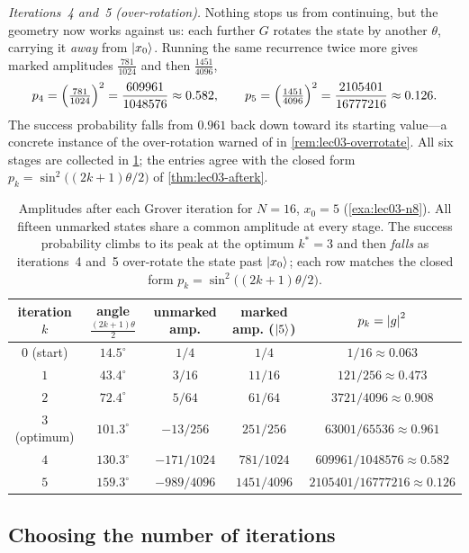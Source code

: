 \begin{example}[A fully worked run: $N=16$, marked item $x_0=5$]
\emph{Iterations~4 and~5 (over-rotation).} Nothing stops us from continuing, but the
geometry now works against us: each further $G$ rotates the state by another
$\theta$, carrying it \emph{away} from $\ket{x_0}$. Running the same recurrence
twice more gives marked amplitudes $\tfrac{781}{1024}$ and then $\tfrac{1451}{4096}$,
\[
  p_4=\Bigl(\tfrac{781}{1024}\Bigr)^{2}=\frac{609961}{1048576}\approx0.582,
  \qquad
  p_5=\Bigl(\tfrac{1451}{4096}\Bigr)^{2}=\frac{2105401}{16777216}\approx0.126.
\]
The success probability falls from $0.961$ back down toward its starting value---a
concrete instance of the over-rotation warned of in \cref{rem:lec03-overrotate}.
All six stages are collected in \cref{tab:lec03-n8}; the entries agree with the
closed form $p_k=\sin^{2}\bigl((2k+1)\theta/2\bigr)$ of \cref{thm:lec03-afterk}.
\end{example}

\begin{table}[t]
\centering
\begin{tabular}{ccccc}
\toprule
iteration $k$ & angle $\tfrac{(2k+1)\theta}{2}$ & unmarked amp. & marked amp. ($\ket5$) & $p_k=\left\lvert g \right\rvert^2$\\
\midrule
$0$ (start)    & $14.5^{\circ}$  & $1/4$       & $1/4$       & $1/16\approx0.063$\\
$1$            & $43.4^{\circ}$  & $3/16$      & $11/16$     & $121/256\approx0.473$\\
$2$            & $72.4^{\circ}$  & $5/64$      & $61/64$     & $3721/4096\approx0.908$\\
$3$ (optimum)  & $101.3^{\circ}$ & $-13/256$   & $251/256$   & $63001/65536\approx0.961$\\
$4$            & $130.3^{\circ}$ & $-171/1024$ & $781/1024$  & $609961/1048576\approx0.582$\\
$5$            & $159.3^{\circ}$ & $-989/4096$ & $1451/4096$ & $2105401/16777216\approx0.126$\\
\bottomrule
\end{tabular}
\caption{Amplitudes after each Grover iteration for $N=16$, $x_0=5$
(\cref{exa:lec03-n8}). All fifteen unmarked states share a common amplitude at every
stage. The success probability climbs to its peak at the optimum $k^{\ast}=3$ and
then \emph{falls} as iterations~4 and~5 over-rotate the state past $\ket{x_0}$;
each row matches the closed form $p_k=\sin^{2}\bigl((2k+1)\theta/2\bigr)$.}
\label{tab:lec03-n8}
\end{table}

\subsection{Choosing the number of iterations}
\label{sec:lec03-iterations}

